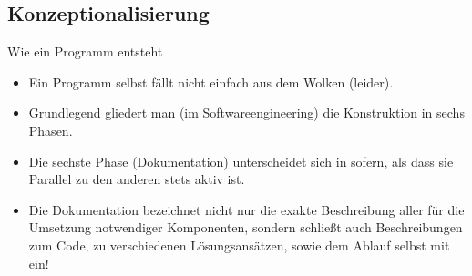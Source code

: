 \subsection{Konzeptionalisierung}

\begin{frame}{Wie ein Programm entsteht}
    \begin{itemize}[<+(1)->]
        \widei
        \item Ein Programm selbst fällt nicht einfach aus dem Wolken (leider).
        \item Grundlegend gliedert man (im Softwareengineering) die Konstruktion in sechs Phasen.
        \item Die sechste Phase (Dokumentation) unterscheidet sich in sofern,\pause{} als dass sie Parallel zu den anderen stets aktiv ist.
        \item Die Dokumentation bezeichnet nicht nur die exakte Beschreibung aller für die Umsetzung notwendiger Komponenten,\pause{} sondern schließt auch Beschreibungen zum Code, zu verschiedenen Lösungsansätzen,\pause{} sowie dem Ablauf selbst mit ein!
    \end{itemize}
\end{frame}

